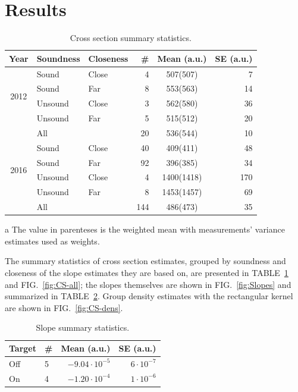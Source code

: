 \documentclass[reprint]{revtex4-1}
\begin{document}
\section{Results}
\begin{table}
\centering
\begin{threeparttable}
\caption{Cross section summary statistics. \label{tbl:CS-all}}
\begin{tabular}{c|llrcr}
\hline\hline
Year						& Soundness		& Closeness		& \#		& Mean\tnote{a} (a.u.)	& SE (a.u.) \\
\hline
\multirow{4}{*}{2012}		& Sound			& Close			& 4			& 507(507)				& 7  \\
							& Sound			& Far			& 8			& 553(563)				& 14 \\
							& Unsound		& Close			& 3			& 562(580)				& 36 \\
							& Unsound		& Far			& 5			& 515(512)				& 20 \\
							& All			& 				& 20		& 536(544)				& 10 \\
\hline					
\multirow{4}{*}{2016}		& Sound			& Close			& 40		& 409(411)				& 48 \\
							& Sound			& Far			& 92		& 396(385)				& 34 \\
							& Unsound		& Close			& 4			& 1400(1418)			& 170\\
							& Unsound		& Far			& 8			& 1453(1457)			& 69 \\
							& All			& 				& 144		& 486(473)				& 35 \\
\hline\hline
\end{tabular}
\begin{tablenotes}
\item[a] The value in parenteses is the weighted mean with measurements' variance estimates used as weights.
\end{tablenotes}
\end{threeparttable}
\end{table}

The summary statistics of cross section estimates, grouped by soundness and closeness of the slope estimates they are based on, are presented in TABLE~\ref{tbl:CS-all} and FIG.~\ref{fig:CS-all}; the slopes themselves are shown in FIG.~\ref{fig:Slopes} and summarized in TABLE~\ref{tbl:Slp-big}. Group density estimates with the rectangular kernel are shown in FIG.~\ref{fig:CS-dens}.

\begin{table}
\centering
\caption{Slope summary statistics. \label{tbl:Slp-big}}
\begin{tabular}{llrr}
\hline\hline
Target		& \#		& Mean (a.u.)						& SE (a.u.) \\
\hline
Off			& 5			& $-9.04\cdot 10^{-5}$				& $6\cdot 10^{-7}$  \\
On			& 4			& $-1.20\cdot 10^{-4}$				& $1\cdot 10^{-6}$ \\
\end{tabular}
\end{table}
\end{document}
